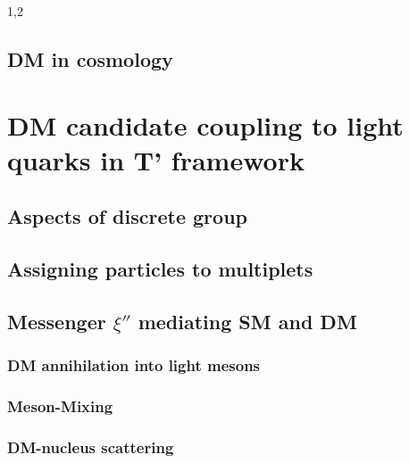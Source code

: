 \documentclass[11pt,a4paper,twoside]{article}
\begin{document}
\begin{spacing}{1,2}
\subsection{DM in cosmology}

\section{DM candidate coupling to light quarks in T' framework}
\subsection{Aspects of discrete group}
\subsection{Assigning particles to multiplets}
\subsection{Messenger $\xi''$ mediating SM and DM}
\subsubsection{DM annihilation into light mesons}
\subsubsection{Meson-Mixing}
\subsubsection{DM-nucleus scattering}


\newpage\listoffigures\newpage
{}
\listoftables\newpage
\end{spacing}
\end{document}

